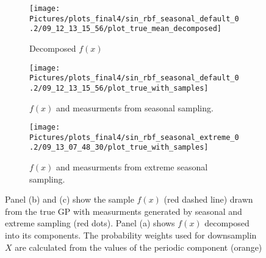 %
%
%

\begin{figure}[!htb]
\centering
\begin{subfigure}{.3\textwidth}
    \centering
    \texttt{[image: 
        Pictures/plots\_final4/sin\_rbf\_seasonal\_default\_0.2/09\_12\_13\_15\_56/plot\_true\_mean\_decomposed]}
    \caption{Decomposed $f(x)$}
\end{subfigure}\hfill
\begin{subfigure}{.3\textwidth}
    \centering
    \texttt{[image: 
        Pictures/plots\_final4/sin\_rbf\_seasonal\_default\_0.2/09\_12\_13\_15\_56/plot\_true\_with\_samples]}
    \caption{$f(x)$ and measurments from seasonal sampling.}
\end{subfigure}\hfill
\begin{subfigure}{.3\textwidth}
    \centering
    \texttt{[image: 
        Pictures/plots\_final4/sin\_rbf\_seasonal\_extreme\_0.2/09\_13\_07\_48\_30/plot\_true\_with\_samples]}
    \caption{$f(x)$ and measurments from extreme seasonal sampling.}
\end{subfigure}
\caption{Panel (b) and (c) show the sample $f(x)$ (red dashed line) drawn from the true GP with measurments generated
by seasonal and extreme sampling (red dots). Panel (a) shows $f(x)$ decomposed into its components.
The probability weights used for downsamplin $X$ are calculated
from the values of the periodic component (orange)}
\label{fig:seasonal-sampling}
\end{figure}



